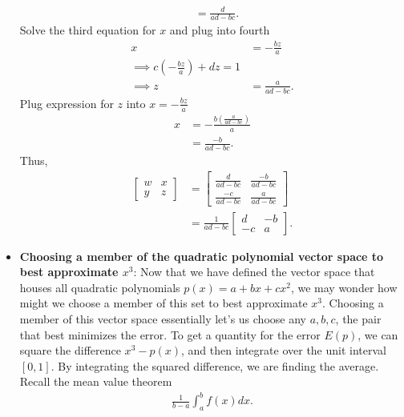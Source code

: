 \documentclass{report}
\begin{document}
\begin{itemize}
\begin{align*}
                &=\frac{d}{ad-bc}
            .\end{align*}
            Solve the third equation for $x$ and plug into fourth
            \begin{align*}
                x &=-\frac{bz}{a} \\
                \implies c\left(-\frac{bz}{a}\right) + dz = 1 \\
                \implies z&= \frac{a}{ad-bc}
            .\end{align*}
            Plug expression for $z$ into $x = -\frac{bz}{a} $
            \begin{align*}
                x &= - \frac{b\left(\frac{a}{ad-bc}\right)}{a} \\
                  &= \frac{-b}{ad-bc}
            .\end{align*}
            \bigbreak \noindent 
            Thus, 
            \begin{align*}
                \begin{bmatrix} w & x \\ y & z \end{bmatrix} &= \begin{bmatrix} \frac{d}{ad-bc} & \frac{-b}{ad-bc} \\ \frac{-c}{ad-bc} & \frac{a}{ad-bc}\end{bmatrix} \\
                                  &= \frac{1}{ad-bc} \begin{bmatrix}d & -b \\ -c & a \end{bmatrix}
            .\end{align*}
        \item \textbf{Choosing a member of the quadratic polynomial vector space to best approximate $x^{3}$}: Now that we have defined the vector space that houses all quadratic polynomials $p(x) = a + bx + cx^{2}$, we may wonder how might we choose a member of this set to best approximate $x^{3}$. Choosing a member of this vector space essentially let's us choose any $a,b,c$, the pair that best minimizes the error.
            \bigbreak \noindent 
            To get a quantity for the error $E(p)$, we can square the difference $x^{3} - p(x)$, and then integrate over the unit interval $[0,1]$. By integrating the squared difference, we are finding the average. Recall the mean value theorem 
            \begin{align*}
                \frac{1}{b-a}\int_a^{b}f(x)dx
            .\end{align*}

\end{itemize}
\end{document}
